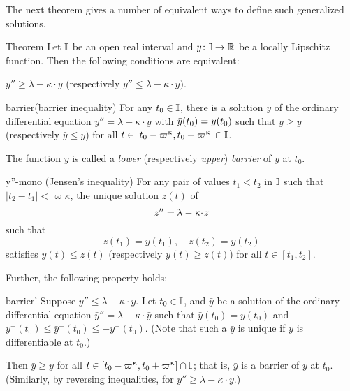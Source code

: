 The next theorem gives a  number of equivalent ways to define such  generalized solutions.

\begin{thm}{Theorem}\label{y''=<1-ky}
Let $\mathbb{I}$ be an open real interval and $y\:\II\to\RR$ be a locally Lipschitz function.
Then the following conditions are equivalent:
\begin{subthm}{}$y''\ge \lambda-\kappa\cdot  y$ (respectively $y''\le \lambda-\kappa\cdot  y).$
\end{subthm}

\begin{subthm}{barrier}(barrier inequality) For any $t_0\in \II$, 
there is a solution $\bar y$ 
of the ordinary differential equation $\bar y''=\lambda-\kappa\cdot  \bar y$ 
with $\bar y(t_0)\z= y(t_0)$ such that $\bar y\ge y$ (respectively $\bar y\le y$) for all $t\in [t_0-\varpi\kappa,t_0+\varpi\kappa]\cap \II$.

The function $\bar y$ is called a {}\emph{lower} (respectively {}\emph{upper}) \emph{barrier} of $y$ at $t_0$.
\end{subthm}



\begin{subthm}{y''-mono} (Jensen's inequality)
For any pair of values $t_1<t_2$ in $\mathbb{I}$ such that $|t_2-t_1|<\varpi\kappa$,  the unique solution $z(t)$ of \[z''\z=\lambda-\kappa\cdot  z\] such that
\[z(t_1)=y(t_1),\quad z(t_2)=y(t_2)\] 
satisfies $y(t)\le z(t)$ (respectively $y(t)\ge z(t)$) for all $t\in[t_1,t_2]$.
\end{subthm}

Further, the following property holds:

\begin{subthm}{barrier'} 
Suppose $y''\le \lambda-\kappa\cdot  y$. Let $t_0\in\II$, and   $\bar y$ be a solution of  the
 ordinary differential equation $\bar y''=\lambda-\kappa\cdot  \bar y$ 
such that  $\bar y(t_0)= y(t_0)$ and 
$y^+(t_0)\le \bar y^+(t_0)\le -y^-(t_0)$.
(Note that such a $\bar{y}$ is unique if $y$ is differentiable at $t_0$.) 

Then $\bar y\ge y$  for all $t\in [t_0-\varpi\kappa,t_0+\varpi\kappa]\cap \II$; that is, $\bar{y}$ is a barrier of $y$ at $t_0$. (Similarly, by reversing inequalities, for $y''\ge \lambda-\kappa\cdot  y$.) 
\end{subthm}
\end{thm}

